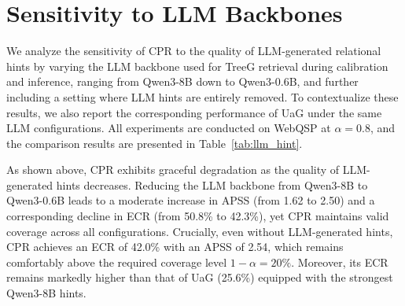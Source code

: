 \documentclass{article}
\theoremstyle{plain}
\theoremstyle{definition}
\theoremstyle{remark}
\begin{document}
\section{Sensitivity to LLM Backbones}
\label{app:llm_hint}
We analyze the sensitivity of CPR to the quality of LLM-generated relational hints by varying the LLM backbone used for TreeG retrieval during calibration and inference, ranging from Qwen3-8B down to Qwen3-0.6B, and further including a setting where LLM hints are entirely removed. To contextualize these results, we also report the corresponding performance of UaG under the same LLM configurations. All experiments are conducted on WebQSP at $\alpha = 0.8$, and the comparison results are presented in Table~\ref{tab:llm_hint}.

\begin{table}[h]
\centering
\caption{Ablation study of LLM hint quality on WebQSP at $\alpha = 0.8$. ``w/o LLM Hints'' denotes TreeG retrieval with relation hints removed. ``Failed'' indicates ECR $< 1 - \alpha$, i.e., the coverage guarantee is violated.}
\setlength{\tabcolsep}{1.5mm}
\label{tab:llm_hint}
\end{table}


As shown above, CPR exhibits graceful degradation as the quality of LLM-generated hints decreases. Reducing the LLM backbone from Qwen3-8B to Qwen3-0.6B leads to a moderate increase in APSS (from 1.62 to 2.50) and a corresponding decline in ECR (from 50.8\% to 42.3\%), yet CPR maintains valid coverage across all configurations. Crucially, even without LLM-generated hints, CPR achieves an ECR of 42.0\% with an APSS of 2.54, which remains comfortably above the required coverage level $1 - \alpha = 20\%$. Moreover, its ECR remains markedly higher than that of UaG (25.6\%) equipped with the strongest Qwen3-8B hints.
\end{document}

